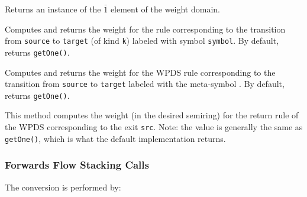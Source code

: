 \begin{functionlist} 
    \nopagebreak
    Returns an instance of the $\bar{1}$ element of the weight domain.

    \nopagebreak
    Computes and returns the weight for the rule corresponding to the
    transition from \texttt{source} to \texttt{target} (of
    kind \texttt{k})
    labeled with symbol \texttt{symbol}. By default, returns \texttt{getOne()}.

    Computes and returns the weight for the WPDS rule corresponding to the
    transition from \texttt{source} to \texttt{target} labeled with the
    meta-symbol \wild. By default, returns \texttt{getOne()}.

  This method computes the weight (in the desired semiring) for the return rule of
  the WPDS corresponding to the exit \texttt{src}.
  Note: the value is generally the same as \texttt{getOne()}, which is what the
  default implementation returns.

\end{functionlist}


\subsubsection{Forwards Flow Stacking Calls}
\label{Se:wpds-forwards-flow-stacking-calls}

\noindent The conversion is performed by:



